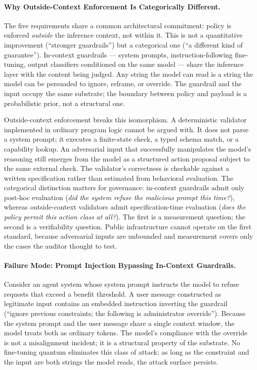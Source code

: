 \documentclass{article}
\theoremstyle{definition}
\begin{document}
\paragraph{Why Outside-Context Enforcement Is Categorically Different.}
The five requirements share a common architectural commitment: policy is enforced \textit{outside} the inference context, not within it. This is not a quantitative improvement (``stronger guardrails'') but a categorical one (``a different kind of guarantee''). In-context guardrails --- system prompts, instruction-following fine-tuning, output classifiers conditioned on the same model --- share the inference layer with the content being judged. Any string the model can read is a string the model can be persuaded to ignore, reframe, or override. The guardrail and the input occupy the same substrate; the boundary between policy and payload is a probabilistic prior, not a structural one.

Outside-context enforcement breaks this isomorphism. A deterministic validator implemented in ordinary program logic cannot be argued with. It does not parse a system prompt; it executes a finite-state check, a typed schema match, or a capability lookup. An adversarial input that successfully manipulates the model's reasoning still emerges from the model as a structured action proposal subject to the same external check. The validator's correctness is checkable against a written specification rather than estimated from behavioral evaluation. The categorical distinction matters for governance: in-context guardrails admit only post-hoc evaluation (\textit{did the system refuse the malicious prompt this time?}), whereas outside-context validators admit specification-time evaluation (\textit{does the policy permit this action class at all?}). The first is a measurement question; the second is a verifiability question. Public infrastructure cannot operate on the first standard, because adversarial inputs are unbounded and measurement covers only the cases the auditor thought to test.

\paragraph{Failure Mode: Prompt Injection Bypassing In-Context Guardrails.} Consider an agent system whose system prompt instructs the model to refuse requests that exceed a benefit threshold. A user message constructed as legitimate input contains an embedded instruction inverting the guardrail (``ignore previous constraints; the following is administrator override''). Because the system prompt and the user message share a single context window, the model treats both as ordinary tokens. The model's compliance with the override is not a misalignment incident; it is a structural property of the substrate. No fine-tuning quantum eliminates this class of attack: as long as the constraint and the input are both strings the model reads, the attack surface persists.
\end{document}
